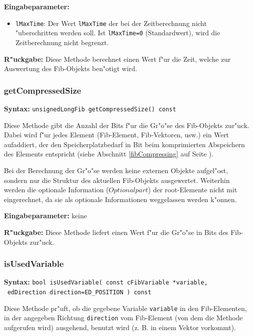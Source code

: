 \bigskip\noindent
\textbf{Eingabeparameter:} 
\begin{itemize}
 \item \verb|lMaxTime|: Der Wert \verb|lMaxTime| der bei der Zeitberechnung nicht "uberschritten werden soll. Ist \verb|lMaxTime=0| (Standardwert), wird die Zeitberechnung nicht begrenzt.
\end{itemize}

\bigskip\noindent
\textbf{R"uckgabe:} Diese Methode berechnet einen Wert f"ur die Zeit, welche zur Auswertung des Fib-Objekts ben"otigt wird.


\subsubsection{getCompressedSize}

\textbf{Syntax:} \verb|unsignedLongFib getCompressedSize() const|

\bigskip\noindent
Diese Methode gibt die Anzahl der Bits f"ur die Gr"o"se des Fib-Objekts zur"uck. Dabei wird f"ur jedes Element (Fib-Element, Fib-Vektoren, usw.) ein Wert aufaddiert, der den Speicherplatzbedarf in Bit beim komprimierten Abspeichern des Elements entspricht (siehe Abschnitt \ref{fibCompressing} auf Seite  \pageref{fibCompressing}).

Bei der Berechnung der Gr"o"se werden keine externen Objekte aufgel"ost, sondern nur die Struktur des aktuellen Fib-Objekts ausgewertet.
Weiterhin werden die optionale Information ($Optionalpart$) der root-Elemente nicht mit eingerechnet, da sie als optionale Informationen weggelassen werden k"onnen.

\bigskip\noindent
\textbf{Eingabeparameter:} keine

\bigskip\noindent
\textbf{R"uckgabe:} Diese Methode liefert einen Wert f"ur die Gr"o"se in Bits des Fib-Objekts zur"uck.


\subsubsection{isUsedVariable}

\textbf{Syntax:} \verb|bool isUsedVariable( const cFibVariable *variable,| \\\verb| edDirection direction=ED_POSITION ) const|

\bigskip\noindent
Diese Methode pr"uft, ob die gegebene Variable \verb|variable| in den Fib-Elementen, in der angegeben Richtung \verb|direction| vom Fib-Element (von dem die Methode aufgerufen wird) ausgehend, benutzt wird (z. B. in einem Vektor vorkommt).

